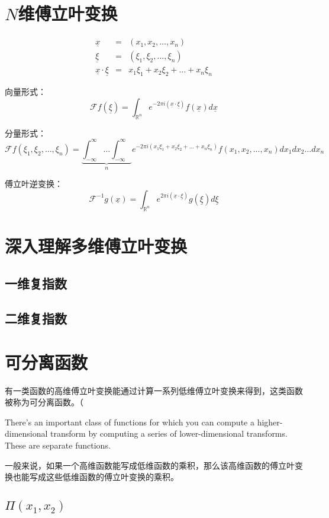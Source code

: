 \section{$N$维傅立叶变换}
$$
	\begin{matrix} \underline{x} &= &(x_1,x_2,…,x_n)\\ \underline{\xi} &= &(\xi_1,\xi_2,…,\xi_n)\\ \underline{x}\cdot \underline{\xi} &= &x_1\xi_1+x_2\xi_2+…+x_n\xi_n \end{matrix}
$$

向量形式：
$$
	\displaystyle{ \mathcal{F}f(\underline{\xi}) = \int_{\mathbb{R}^n}e^{-2\pi i(\underline{x}\cdot \underline{\xi})}f(\underline{x})d\underline{x} }
$$

分量形式：
$$
	\displaystyle{ \mathcal{F}f(\xi_1,\xi_2,…,\xi_n) = \underbrace{\int_{-\infty}^{\infty}…\int_{-\infty}^{\infty}}_{n}e^{-2\pi i(x_1\xi_1+x_2\xi_2+...+x_n\xi_n)}f(x_1,x_2,...,x_n)dx_1dx_2…dx_n }
$$

傅立叶逆变换：
$$
	\displaystyle{ \mathcal{F}^{-1}g(\underline{x}) = \int_{\mathbb{R}^n}e^{2\pi i(\underline{x}\cdot \underline{\xi})}g(\underline{\xi})d\underline{\xi} }
$$
\section{深入理解多维傅立叶变换}
\subsection{一维复指数}
\subsection{二维复指数}
\section{可分离函数}
有一类函数的高维傅立叶变换能通过计算一系列低维傅立叶变换来得到，这类函数被称为可分离函数。（

There's an important class of functions for which you can compute a higher-dimensional transform by computing a series of lower-dimensional transforms. These are separate functions.

一般来说，如果一个高维函数能写成低维函数的乘积，那么该高维函数的傅立叶变换也能写成这些低维函数的傅立叶变换的乘积。
\subsection{$\Pi(x_1,x_2)$}
